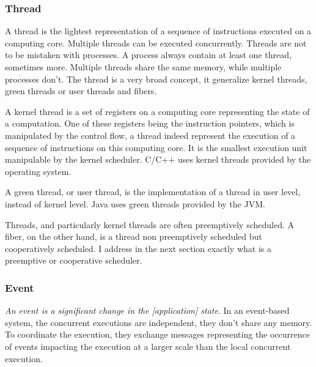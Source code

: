 

\subsubsection{Thread}

A thread is the lightest representation of a sequence of instructions executed on a computing core.
Multiple threads can be executed concurrently.
Threads are not to be mistaken with processes.
A process always contain at least one thread, sometimes more.
Multiple threads share the same memory, while multiple processes don't.
The thread is a very broad concept, it generalize kernel threads, green threads or user threads and fibers\cite{Adya2002}.

A kernel thread is a set of registers on a computing core representing the state of a computation.
One of these registers being the instruction pointers, which is manipulated by the control flow, a thread indeed represent the execution of a sequence of instructions on this computing core.
It is the smallest execution unit manipulable by the kernel scheduler.
C/C++ uses kernel threads provided by the operating system.

A green thread, or user thread, is the implementation of a thread in user level, instead of kernel level.
Java uses green threads provided by the JVM.

Threads, and particularly kernel threads are often preemptively scheduled.
A fiber, on the other hand, is a thread non preemptively scheduled but cooperatively scheduled.
I address in the next section exactly what is a preemptive or cooperative scheduler.

\subsubsection{Event}

\textit{An event is a significant change in the [application] state}\cite{Chandy2006}.
In an event-based system, the concurrent executions are independent, they don't share any memory.
To coordinate the execution, they exchange messages representing the occurrence of events impacting the execution at a larger scale than the local concurrent execution.

